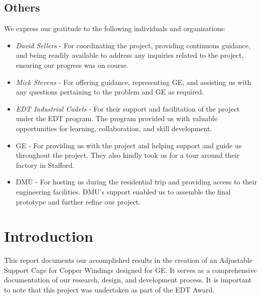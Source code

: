 \documentclass[a4paper,10pt]{article}
\begin{document}
\subsection{Others}
We express our gratitude to the following individuals and organisations:
\begin{itemize}
  \item{\textit{David Sellers} - For coordinating the project, providing continuous guidance, and being readily available to address any inquiries related to the project, ensuring our progress was on course.}
  \item{\textit{Mick Stevens} - For offering guidance, representing \gls{GE}, and assisting us with any questions pertaining to the problem and \gls{GE} as required.}
  \item{\textit{EDT Industrial Cadets}} - For their support and facilitation of the project under the EDT program. The program provided us with valuable opportunities for learning, collaboration, and skill development.
  \item{\gls{GE}} - For providing us with the project and helping support and guide us throughout the project. They also kindly took us for a tour around their factory in Stafford.
  \item {\gls{DMU}} - For hosting us during the residential trip and providing access to their engineering facilities. \gls{DMU}'s support enabled us to assemble the final prototype and further refine our project.
\end{itemize}
\pagebreak



\section{Introduction}
This report documents our accomplished results in the creation of an Adjustable Support Cage for Copper Windings designed for \gls{GE}. It serves as a comprehensive documentation of our research, design, and development process. It is important to note that this project was undertaken as part of the \gls{EDT} Award.
\end{document}
